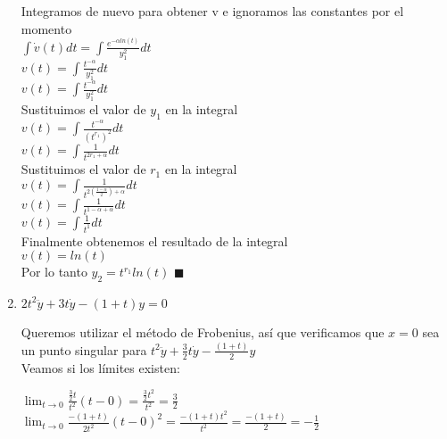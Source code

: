 \documentclass{article}
\begin{document}
\begin{enumerate}
{        	Integramos de nuevo para obtener v e ignoramos las constantes por el momento\\
        	$\int \dot{v}(t) dt = \int \frac{e^{-\alpha ln(t)}}{y_1^2} dt$\\
        	$v(t) = \int \frac{t^{-\alpha}}{y_1^2}dt$\\
        	$v(t) = \int \frac{t^{-\alpha}}{y_1^2}dt$\\
        	
        	Sustituimos el valor de $y_1$ en la integral\\
        	$v(t) = \int \frac{t^{-\alpha}}{(t^{r_1})^2}dt$\\
        	$v(t) = \int \frac{1}{t^{2r_1 + \alpha}}dt$\\
        	
        	Sustituimos el valor de $r_1$ en la integral\\
        	$v(t) = \int \frac{1}{t^{2(\frac{1 - \alpha}{2}) + \alpha}}dt$\\
        	$v(t) = \int \frac{1}{t^{1 - \alpha + \alpha}}dt$\\
        	$v(t) = \int \frac{1}{t^{1}}dt$\\
        	
        	Finalmente obtenemos el resultado de la integral\\
        	$v(t) = ln(t)$\\
        	
        	Por lo tanto $y_2 = t^{r_1}ln(t)$ $\blacksquare$\\
        	
        	
        	
        	
        	
        }
        \item {
        	$2t^2\ddot y + 3t\dot y - (1 + t)y = 0$
        	
        	\color{azul}
        	Queremos utilizar el método de Frobenius, así que verificamos que $x= 0$ sea un punto singular para $ t^2\ddot{y} + \frac{3}{2}t\dot{y} - \frac{(1 + t)}{2} y$\\
        	
        	Veamos si los límites existen:
        	
        	$\lim_{t \rightarrow 0} \frac{\frac{3}{2} t}{t^2} (t-0) = \frac{\frac{3}{2}t^2}{t^2} = \frac{3}{2}$\\
        	$\lim_{t \rightarrow 0} \frac{-(1+t)}{2t^2} (t-0)^2 = \frac{-(1+t)t^2}{t^2} = \frac{-(1+t)}{2} = -\frac{1}{2}$\\
        	
}
\end{enumerate}
\end{document}
